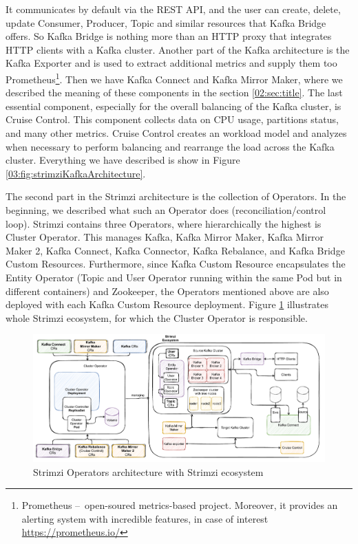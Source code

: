 It communicates by default via the REST API, and the user can create, delete, update Consumer, Producer, Topic and similar resources that Kafka Bridge offers.
 So Kafka Bridge is nothing more than an HTTP proxy that integrates HTTP clients with a Kafka cluster.
 Another part of the Kafka architecture is the Kafka Exporter and is used to extract additional metrics and supply them too Prometheus\footnote{Prometheus \---\ open-soured metrics-based project. Moreover, it provides an alerting system with incredible features, in case of interest \url{https://prometheus.io/}}.
 Then we have Kafka Connect and Kafka Mirror Maker, where we described the meaning of these components in the section \ref{02:sec:title}.
 The last essential component, especially for the overall balancing of the Kafka cluster, is Cruise Control.
 This component collects data on CPU usage, partitions status, and many other metrics.
 Cruise Control creates an workload model and analyzes when necessary to perform balancing and rearrange the load across the Kafka cluster.
 Everything we have described is show in Figure \ref{03:fig:strimziKafkaArchitecture}.

The second part in the Strimzi architecture is the collection of Operators.
In the beginning, we described what such an Operator does (reconciliation/control loop).
Strimzi contains three Operators, where hierarchically the highest is Cluster Operator.
This manages Kafka, Kafka Mirror Maker, Kafka Mirror Maker 2, Kafka Connect, Kafka Connector, Kafka Rebalance, and Kafka Bridge Custom Resources.
Furthermore, since Kafka Custom Resource encapsulates the Entity Operator (Topic and User Operator running within the same Pod but in different containers) and Zookeeper, the Operators mentioned above are also deployed with each Kafka Custom Resource deployment.
Figure \ref{03:fig:strimziOperatorsArchitecture} illustrates whole Strimzi ecosystem, for which the Cluster Operator is responsible.

\begin{figure}[!ht]
    \centering
    \includegraphics[scale=0.60]{obrazky-figures/02-preliminaries/03-strimzi/04-stirmziOperatorsArch.pdf}
    \caption{Strimzi Operators architecture with Strimzi ecosystem}
    \label{03:fig:strimziOperatorsArchitecture}
\end{figure}


